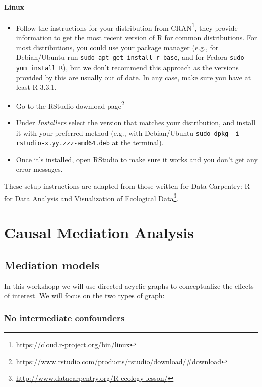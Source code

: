 \documentclass[
  12pt, krantz2,
]{book}
\newcommand{\passthrough}[1]{#1}
\providecommand{\tightlist}{%
  \setlength{\itemsep}{0pt}\setlength{\parskip}{0pt}}
\renewcommand{\href}[2]{#2\footnote{\url{#1}}}
\theoremstyle{definition}
\theoremstyle{definition}
\theoremstyle{definition}
\newcommand{\1}{\mathbbm{1}}
\begin{document}
\hypertarget{linux}{%
\subsubsection{Linux}\label{linux}}

\begin{itemize}
\tightlist
\item
  Follow the instructions for your distribution
  from \href{https://cloud.r-project.org/bin/linux}{CRAN}, they provide information
  to get the most recent version of R for common distributions. For most
  distributions, you could use your package manager (e.g., for Debian/Ubuntu run
  \passthrough{\lstinline!sudo apt-get install r-base!}, and for Fedora \passthrough{\lstinline!sudo yum install R!}), but we
  don't recommend this approach as the versions provided by this are
  usually out of date. In any case, make sure you have at least R 3.3.1.
\item
  Go to the \href{https://www.rstudio.com/products/rstudio/download/\#download}{RStudio download
  page}
\item
  Under \emph{Installers} select the version that matches your distribution, and
  install it with your preferred method (e.g., with Debian/Ubuntu \passthrough{\lstinline!sudo dpkg -i rstudio-x.yy.zzz-amd64.deb!} at the terminal).
\item
  Once it's installed, open RStudio to make sure it works and you don't get any
  error messages.
\end{itemize}

These setup instructions are adapted from those written for \href{http://www.datacarpentry.org/R-ecology-lesson/}{Data Carpentry: R
for Data Analysis and Visualization of Ecological
Data}.

\hypertarget{mediation}{%
\chapter{Causal Mediation Analysis}\label{mediation}}

\hypertarget{mediation-models}{%
\section{Mediation models}\label{mediation-models}}

In this workshopp we will use directed acyclic graphs to conceptualize
the effects of interest. We will focus on the two types of graph:

\hypertarget{no-intermediate-confounders}{%
\subsection{No intermediate confounders}\label{no-intermediate-confounders}}
\end{document}
